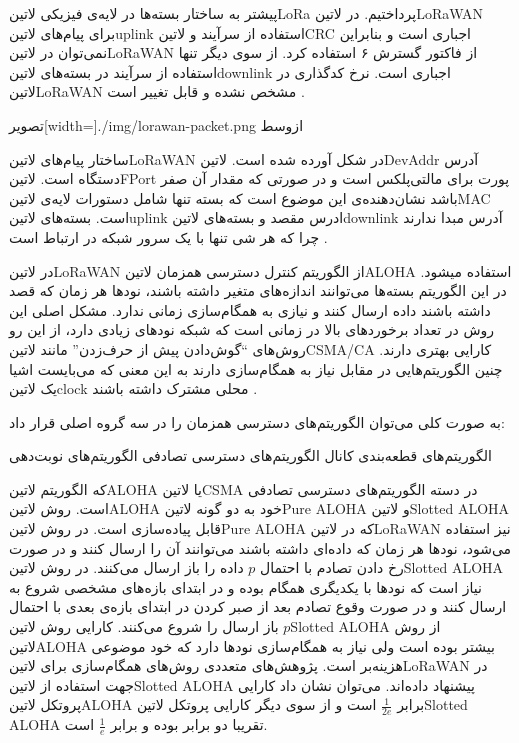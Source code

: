 پیشتر به ساختار بسته‌ها در لایه‌ی فیزیکی ‌لاتین{LoRa} پرداختیم. در ‌لاتین{LoRaWAN} برای پیام‌های ‌لاتین{uplink} استفاده از سرآیند و ‌لاتین{CRC} اجباری است
و بنابراین نمی‌توان در ‌لاتین{LoRaWAN} از فاکتور گسترش ۶ استفاده کرد. از سوی دیگر تنها استفاده از سرآیند در بسته‌های ‌لاتین{downlink} اجباری است.
نرخ کدگذاری در ‌لاتین{LoRaWAN} مشخص نشده و قابل تغییر است
.

‌تصویر[width=\textwidth]{./img/lorawan-packet.png}
‌ازوسط

ساختار پیام‌های ‌لاتین{LoRaWAN} در شکل  آورده شده است. ‌لاتین{DevAddr} آدرس دستگاه است.
‌لاتین{FPort} پورت برای مالتی‌پلکس است و در صورتی که مقدار آن صفر باشد نشان‌دهنده‌ی این موضوع است که بسته تنها شامل
دستورات لایه‌ی ‌لاتین{MAC} است. بسته‌های ‌لاتین{uplink} ادرس مقصد و بسته‌های ‌لاتین{downlink} آدرس مبدا ندارند
چرا که هر شی تنها با یک سرور شبکه در ارتباط است
.

در ‌لاتین{LoRaWAN} از الگوریتم کنترل دسترسی همزمان ‌لاتین{ALOHA} استفاده میشود. در این الگوریتم بسته‌ها می‌توانند اندازه‌های متغیر داشته باشند، نودها هر زمان که قصد داشته باشند داده ارسال کنند و نیازی به همگام‌سازی زمانی ندارد.
مشکل اصلی این روش در تعداد برخوردهای بالا در زمانی است که شبکه نودهای زیادی دارد، از این رو روش‌های ``گوش‌دادن پیش از حرف‌زدن'' مانند ‌لاتین{CSMA/CA} کارایی بهتری دارند.
چنین الگوریتم‌هایی در مقابل نیاز به همگام‌سازی دارند به این معنی که می‌بایست اشیا یک ‌لاتین{clock} محلی مشترک داشته باشند
.

به صورت کلی می‌توان الگوریتم‌های دسترسی همزمان را در سه گروه اصلی قرار داد:

 الگوریتم‌های قطعه‌بندی کانال
 الگوریتم‌های دسترسی تصادفی
 الگوریتم‌های نوبت‌دهی

که الگوریتم ‌لاتین{ALOHA} یا ‌لاتین{CSMA} در دسته الگوریتم‌های دسترسی تصادفی است. روش ‌لاتین{ALOHA} خود به دو گونه ‌لاتین{Pure ALOHA} و ‌لاتین{Slotted ALOHA}
قابل پیاده‌سازی است. در روش ‌لاتین{Pure ALOHA} که در ‌لاتین{LoRaWAN} نیز استفاده می‌شود، نودها هر زمان که داده‌ای داشته باشند می‌توانند آن را ارسال کنند و در صورت رخ دادن تصادم
با احتمال $p$ داده را باز ارسال می‌کنند. در روش ‌لاتین{Slotted ALOHA} نیاز است که نودها با یکدیگری همگام بوده و در ابتدای بازه‌های مشخصی شروع به ارسال کنند و در صورت
وقوع تصادم بعد از صبر کردن در ابتدای بازه‌ی بعدی با احتمال $p$ باز ارسال را شروع می‌کنند. کارایی روش ‌لاتین{Slotted ALOHA} از روش ‌لاتین{ALOHA} بیشتر بوده است ولی نیاز به همگام‌سازی نودها دارد
که خود موضوعی هزینه‌بر است. پژوهش‌های متعددی روش‌های همگام‌سازی برای ‌لاتین{LoRaWAN} در جهت استفاده از ‌لاتین{Slotted ALOHA} پیشنهاد داده‌اند.
می‌توان نشان داد کارایی پروتکل ‌لاتین{ALOHA} برابر $\frac{1}{2e}$ است و از سوی دیگر کارایی پروتکل ‌لاتین{Slotted ALOHA} تقریبا دو برابر بوده و برابر $\frac{1}{e}$ است.

